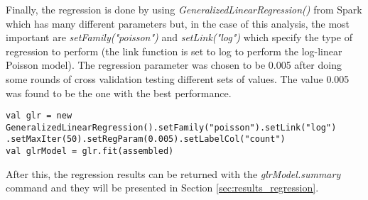 Finally, the regression is done by using \textit{GeneralizedLinearRegression()} from Spark \cite{sparkregression} which has many different parameters but, in the case of this analysis, the most important are \textit{setFamily("poisson")} and \textit{setLink("log")} which specify the type of regression to perform (the link function is set to log to perform the log-linear Poisson model). The regression parameter was chosen to be 0.005 after doing some rounds of cross validation testing different sets of values. The value 0.005 was found to be the one with the best performance. \\
\begin{lstlisting}[style=myScalastyle]
val glr = new GeneralizedLinearRegression().setFamily("poisson").setLink("log") .setMaxIter(50).setRegParam(0.005).setLabelCol("count")
val glrModel = glr.fit(assembled)
\end{lstlisting}
After this, the regression results can be returned with the \textit{glrModel.summary} command and they will be presented in Section \ref{sec:results_regression}.




